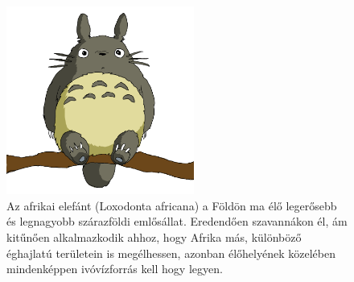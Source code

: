 \documentclass[a4paper]{article}
\begin{document}
\begin{figure}
\centering
\includegraphics[width=0.55\textwidth]{totoro.png}
\caption{Az afrikai elefánt (Loxodonta africana) a Földön ma élő legerősebb és
legnagyobb szárazföldi emlősállat. Eredendően szavannákon él, ám
kitűnően alkalmazkodik ahhoz, hogy Afrika más, különböző éghajlatú
területein is megélhessen, azonban élőhelyének közelében mindenképpen
ivóvízforrás kell hogy legyen.}
\end{figure}
\end{document}
